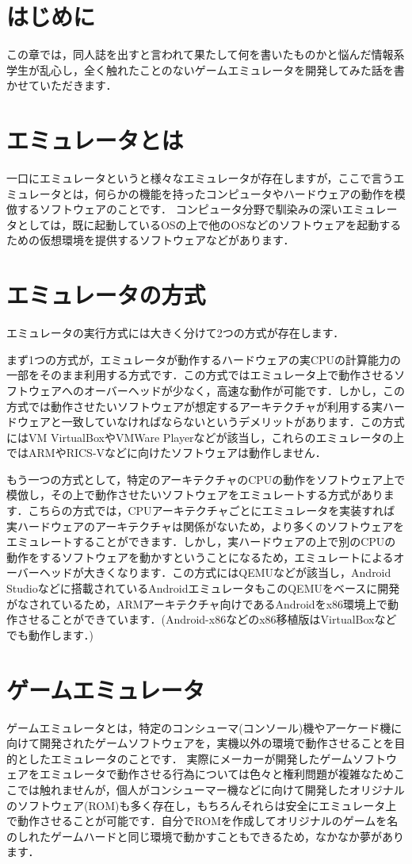 \section{はじめに}
この章では，同人誌を出すと言われて果たして何を書いたものかと悩んだ情報系学生が乱心し，全く触れたことのないゲームエミュレータを開発してみた話を書かせていただきます．

\section{エミュレータとは}
一口にエミュレータというと様々なエミュレータが存在しますが，ここで言うエミュレータとは，何らかの機能を持ったコンピュータやハードウェアの動作を模倣するソフトウェアのことです．
コンピュータ分野で馴染みの深いエミュレータとしては，既に起動しているOSの上で他のOSなどのソフトウェアを起動するための仮想環境を提供するソフトウェアなどがあります．

\section{エミュレータの方式}
エミュレータの実行方式には大きく分けて2つの方式が存在します．

まず1つの方式が，エミュレータが動作するハードウェアの実CPUの計算能力の一部をそのまま利用する方式です．この方式ではエミュレータ上で動作させるソフトウェアへのオーバーヘッドが少なく，高速な動作が可能です．しかし，この方式では動作させたいソフトウェアが想定するアーキテクチャが利用する実ハードウェアと一致していなければならないというデメリットがあります．この方式にはVM VirtualBoxやVMWare Playerなどが該当し，これらのエミュレータの上ではARMやRICS-Vなどに向けたソフトウェアは動作しません．

もう一つの方式として，特定のアーキテクチャのCPUの動作をソフトウェア上で模倣し，その上で動作させたいソフトウェアをエミュレートする方式があります．こちらの方式では，CPUアーキテクチャごとにエミュレータを実装すれば実ハードウェアのアーキテクチャは関係がないため，より多くのソフトウェアをエミュレートすることができます．しかし，実ハードウェアの上で別のCPUの動作をするソフトウェアを動かすということになるため，エミュレートによるオーバーヘッドが大きくなります．この方式にはQEMUなどが該当し，Android Studioなどに搭載されているAndroidエミュレータもこのQEMUをベースに開発がなされているため，ARMアーキテクチャ向けであるAndroidをx86環境上で動作させることができています．(Android-x86などのx86移植版はVirtualBoxなどでも動作します．)

\section{ゲームエミュレータ}
ゲームエミュレータとは，特定のコンシューマ(コンソール)機やアーケード機に向けて開発されたゲームソフトウェアを，実機以外の環境で動作させることを目的としたエミュレータのことです．
実際にメーカーが開発したゲームソフトウェアをエミュレータで動作させる行為については色々と権利問題が複雑なためここでは触れませんが，個人がコンシューマー機などに向けて開発したオリジナルのソフトウェア(ROM)も多く存在し，もちろんそれらは安全にエミュレータ上で動作させることが可能です．自分でROMを作成してオリジナルのゲームを名のしれたゲームハードと同じ環境で動かすこともできるため，なかなか夢があります．

